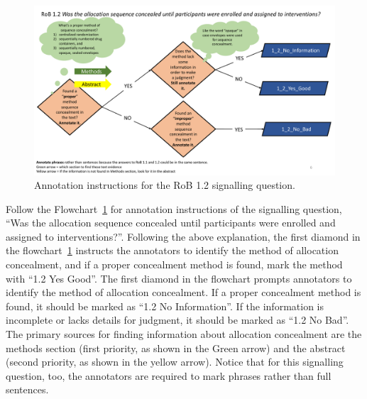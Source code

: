 \documentclass[sn-mathphys,Numbered]{sn-jnl}%
\begin{document}
%
%
%
\begin{figure}[hbt]
    \centering
    \includegraphics[width=\textwidth]{figures/1_2.pdf}
    \caption{Annotation instructions for the RoB 1.2 signalling question.}
    \label{fig:1_2}
\end{figure}
%
%
%

Follow the Flowchart~\ref{fig:1_2} for annotation instructions of the signalling question, ``Was the allocation sequence concealed until participants were enrolled and assigned to interventions?''.
Following the above explanation, the first diamond in the flowchart~\ref{fig:1_2} instructs the annotators to identify the method of allocation concealment, and if a proper concealment method is found, mark the method with ``1.2 Yes Good''.
The first diamond in the flowchart prompts annotators to identify the method of allocation concealment. If a proper concealment method is found, it should be marked as ``1.2 No Information''.
If the information is incomplete or lacks details for judgment, it should be marked as ``1.2 No Bad''.
The primary sources for finding information about allocation concealment are the methods section (first priority, as shown in the Green arrow) and the abstract (second priority, as shown in the yellow arrow).
Notice that for this signalling question, too, the annotators are required to mark phrases rather than full sentences.
%
%
%
\end{document}
